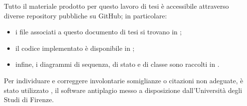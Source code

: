 \medskip

Tutto il materiale prodotto per questo lavoro di tesi è accessibile attraverso diverse repository pubbliche su GitHub; in particolare:

\begin{itemize}

\item i file \latex associati a questo documento di tesi si trovano in \myThesisRepo;

\item il codice implementato è disponibile in \myCodeRepo;

\item infine, i diagrammi di sequenza, di stato e di classe sono raccolti in \myDiagramsRepo.

\end{itemize}

Per individuare e correggere involontarie somiglianze o citazioni non adeguate, è stato utilizzato \myAntiplagio, il software antiplagio messo a disposizione dall'Università degli Studi di Firenze.